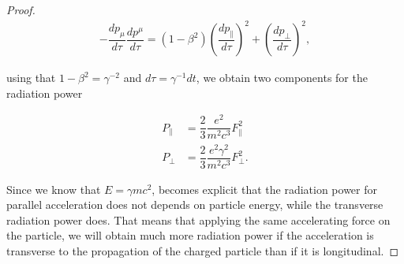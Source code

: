 \begin{proof}
 \begin{align*}
 -\dfrac{d{p_\mu}}{d\tau}\dfrac{dp^\mu}{d\tau} = (1- \beta^2)\left(\dfrac{dp_\parallel}{d\tau}\right)^2 + \left(\dfrac{dp_\perp}{d\tau}\right)^2,
 \end{align*}

 using that $1-\beta^2 = \gamma^{-2}$ and $d\tau = \gamma^{-1}dt$, we obtain two components for the radiation power

\begin{align*}
P_\parallel &=   \dfrac{2}{3}\dfrac{e^2}{m^2c^3}F_\parallel^2 \\
P_\perp &=   \dfrac{2}{3}\dfrac{e^2 \gamma^2}{m^2c^3}F_\perp^2 .
\end{align*}

Since we know that $E = \gamma mc^2$, becomes explicit that the radiation power for parallel acceleration does not depends on particle energy, while the transverse radiation power does. That means that applying the same accelerating force on the particle, we will obtain much more radiation power if the acceleration
is transverse to the propagation of the charged particle than if it is longitudinal.
\end{proof}


